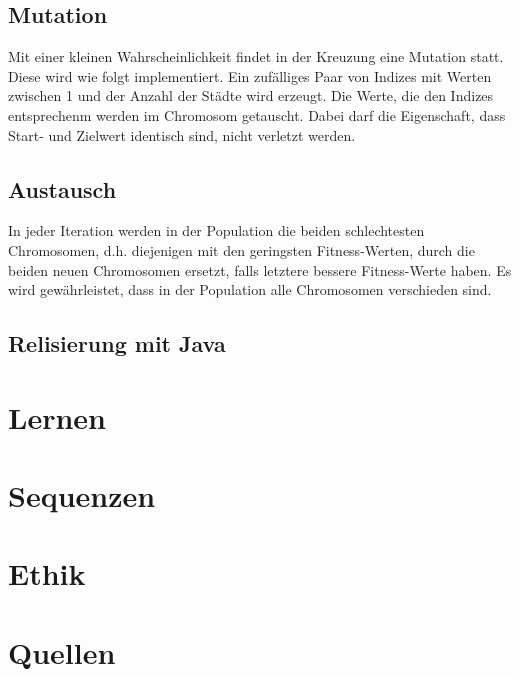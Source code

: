 \documentclass[11pt]{article}
\begin{document}
    \subsection{Mutation}
    Mit einer kleinen Wahrscheinlichkeit findet in der Kreuzung eine Mutation statt. Diese wird
    wie folgt implementiert. Ein zufälliges Paar von Indizes mit Werten zwischen 1 und der Anzahl
    der Städte wird erzeugt. Die Werte, die den Indizes entsprechenm werden im Chromosom getauscht.
    Dabei darf die Eigenschaft, dass Start- und Zielwert identisch sind, nicht verletzt werden.

    \subsection{Austausch}
    In jeder Iteration werden in der Population die beiden schlechtesten Chromosomen, d.h.
    diejenigen mit den geringsten Fitness-Werten, durch die beiden neuen Chromosomen ersetzt, falls
    letztere bessere Fitness-Werte haben. Es wird gewährleistet, dass in der Population alle
    Chromosomen verschieden sind.

    \subsection{Relisierung mit Java}

    \section{Lernen}


    \section{Sequenzen}


    \section{Ethik}


    \section{Quellen}
\end{document}
